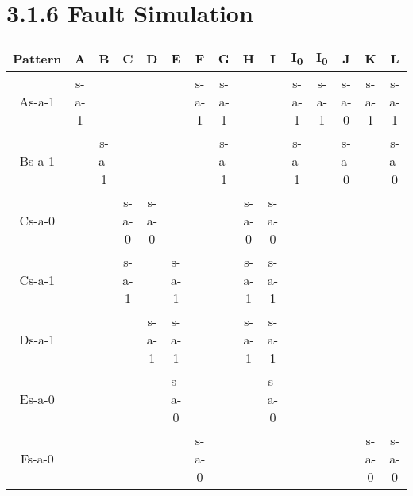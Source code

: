 \documentclass[11pt]{report}
\begin{document}
\section*{3.1.6 Fault Simulation}
\begin{tabular}{|c||c|c|c|c|c|c|c|c|c|c|c|c|c|c|}
\hline
Pattern & A & B & C & D & E & F & G & H & I & I\textsubscript{0} & I\textsubscript{0} & J & K & L \\
\hline
\hline
As-a-1 & s-a-1 & & & & & s-a-1 & s-a-1 & & & s-a-1 & s-a-1 & s-a-0 & s-a-1 & s-a-1 \\
\hline
Bs-a-1 & & s-a-1 & & & & & s-a-1 & & & s-a-1 & & s-a-0 & & s-a-0 \\
\hline
Cs-a-0 & & & s-a-0 & s-a-0 & & & & s-a-0 & s-a-0 & & & & & \\
\hline
Cs-a-1 & & & s-a-1 & & s-a-1 & & & s-a-1 & s-a-1 & & & & & \\
\hline
Ds-a-1 & & & & s-a-1 & s-a-1 & & & s-a-1 & s-a-1 & & & & & \\
\hline
Es-a-0 & & & & & s-a-0 & & & & s-a-0 & & & & & \\
\hline
Fs-a-0 & & & & & & s-a-0 & & & & & & & s-a-0 & s-a-0 \\
\hline
\end{tabular}
\end{document}

